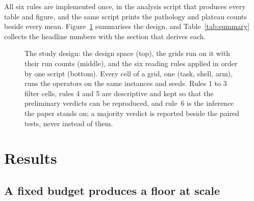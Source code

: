 \documentclass[preprint,11pt,3p]{elsarticle}
\begin{document}
\begin{table}[htbp]
\centering
\caption{Operating characteristics of the per-cell form of rule~6 on grid~2, MAE. For each
number of valid seed pairs $|S|$: the smallest two-sided $p$ the exact Wilcoxon test can return,
that value times the \numGthreeArmCells{} cells of the Holm family, whether any outcome can
survive the correction, how many cells have that $|S|$, and the median over those cells of the
minimum detectable effect at $\alpha=0.05$ (uncorrected) and 80\% power, in MAE units, from each
cell's own seed dispersion.}
\label{tab:power}

\end{table}
All six rules are implemented once, in the analysis script that produces every table and figure,
and the same script prints the pathology and plateau counts beside every mean.
Figure~\ref{fig:protocol} summarises the design, and Table~\ref{tab:summary} collects the headline
numbers with the section that derives each.

\begin{figure}[htbp]
\centering

\caption{The study design: the design space (top), the grids run on it with their run counts
(middle), and the six reading rules applied in order by one script (bottom). Every cell of a
grid, one (task, shell, arm), runs the operators on the same instances and seeds. Rules 1 to 3
filter cells, rules 4 and 5 are descriptive and kept so that the preliminary verdicts can be
reproduced, and rule~6 is the inference the paper stands on; a majority verdict is reported
beside the paired tests, never instead of them.}
\label{fig:protocol}
\end{figure}

\begin{table}[htbp]
\centering
\caption{Headline numbers and where each is derived. Every value is generated from the result
files by the same script that produces the figures.}
\label{tab:summary}

\end{table}

\section{Results}
\label{sec:results}

\subsection{A fixed budget produces a floor at scale}
\label{sec:floor}
\end{document}
